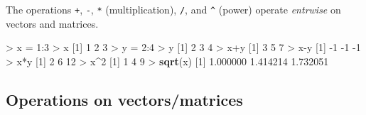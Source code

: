 \documentclass[]{article}
\newenvironment{Shaded}{\begin{snugshade}}{\end{snugshade}}
\newcommand{\KeywordTok}[1]{\textcolor[rgb]{0.13,0.29,0.53}{\textbf{{#1}}}}
\newcommand{\DecValTok}[1]{\textcolor[rgb]{0.00,0.00,0.81}{{#1}}}
\newcommand{\FloatTok}[1]{\textcolor[rgb]{0.00,0.00,0.81}{{#1}}}
\newcommand{\StringTok}[1]{\textcolor[rgb]{0.31,0.60,0.02}{{#1}}}
\newcommand{\NormalTok}[1]{{#1}}
\begin{document}
The operations \texttt{+}, \texttt{-}, \texttt{*} (multiplication),
\texttt{/}, and \texttt{\^{}} (power) operate \emph{entrwise} on vectors
and matrices.

\begin{Shaded}
\begin{Highlighting}[]
\NormalTok{>}\StringTok{ }\NormalTok{x =}\StringTok{ }\DecValTok{1}\NormalTok{:}\DecValTok{3}
\NormalTok{>}\StringTok{ }\NormalTok{x}
\NormalTok{[}\DecValTok{1}\NormalTok{] }\DecValTok{1} \DecValTok{2} \DecValTok{3}
\NormalTok{>}\StringTok{ }\NormalTok{y =}\StringTok{ }\DecValTok{2}\NormalTok{:}\DecValTok{4}
\NormalTok{>}\StringTok{ }\NormalTok{y}
\NormalTok{[}\DecValTok{1}\NormalTok{] }\DecValTok{2} \DecValTok{3} \DecValTok{4}
\NormalTok{>}\StringTok{ }\NormalTok{x+y}
\NormalTok{[}\DecValTok{1}\NormalTok{] }\DecValTok{3} \DecValTok{5} \DecValTok{7}
\NormalTok{>}\StringTok{ }\NormalTok{x-y}
\NormalTok{[}\DecValTok{1}\NormalTok{] -}\DecValTok{1} \NormalTok{-}\DecValTok{1} \NormalTok{-}\DecValTok{1}
\NormalTok{>}\StringTok{ }\NormalTok{x*y}
\NormalTok{[}\DecValTok{1}\NormalTok{]  }\DecValTok{2}  \DecValTok{6} \DecValTok{12}
\NormalTok{>}\StringTok{ }\NormalTok{x^}\DecValTok{2}
\NormalTok{[}\DecValTok{1}\NormalTok{] }\DecValTok{1} \DecValTok{4} \DecValTok{9}
\NormalTok{>}\StringTok{ }\KeywordTok{sqrt}\NormalTok{(x)}
\NormalTok{[}\DecValTok{1}\NormalTok{] }\FloatTok{1.000000} \FloatTok{1.414214} \FloatTok{1.732051}
\end{Highlighting}
\end{Shaded}

\subsection{Operations on
vectors/matrices}\label{operations-on-vectorsmatrices-1}
\end{document}
